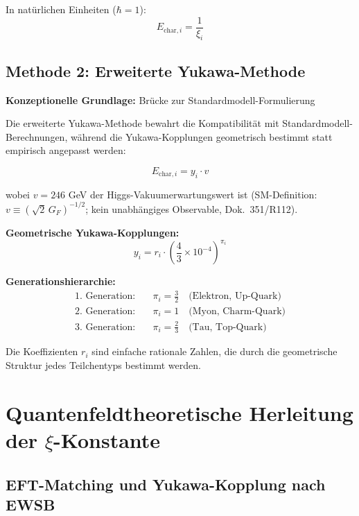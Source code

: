 In natürlichen Einheiten ($\hbar = 1$):
\begin{equation}
	\boxed{E_{\text{char},i} = \frac{1}{\xi_i}}
	\label{eq:characteristic_energy_direct}
\end{equation}

\subsection{Methode 2: Erweiterte Yukawa-Methode}
\label{subsec:extended_yukawa_method}

\textbf{Konzeptionelle Grundlage:} Brücke zur Standardmodell-Formulierung

Die erweiterte Yukawa-Methode bewahrt die Kompatibilität mit Standardmodell-Berechnungen, während die Yukawa-Kopplungen geometrisch bestimmt statt empirisch angepasst werden:

\begin{equation}
	E_{\text{char},i} = y_i \cdot v
	\label{eq:yukawa_mass_formula}
\end{equation}

wobei $v = 246$ GeV der Higgs-Vakuumerwartungswert ist (SM-Definition: $v\equiv(\sqrt{2}\,G_F)^{-1/2}$; kein unabhängiges Observable, Dok.~351/R112).

\textbf{Geometrische Yukawa-Kopplungen:}
\begin{equation}
	\boxed{y_i = r_i \cdot \left(\frac{4}{3} \times 10^{-4}\right)^{\pi_i}}
	\label{eq:geometric_yukawa}
\end{equation}

\textbf{Generationshierarchie:}
\begin{align}
	\text{1. Generation:} \quad &\pi_i = \frac{3}{2} \quad \text{(Elektron, Up-Quark)} \\
	\text{2. Generation:} \quad &\pi_i = 1 \quad \text{(Myon, Charm-Quark)} \\
	\text{3. Generation:} \quad &\pi_i = \frac{2}{3} \quad \text{(Tau, Top-Quark)}
\end{align}

Die Koeffizienten $r_i$ sind einfache rationale Zahlen, die durch die geometrische Struktur jedes Teilchentyps bestimmt werden.

\section{Quantenfeldtheoretische Herleitung der $\xi$-Konstante}
\label{sec:qft_derivation}

\subsection{EFT-Matching und Yukawa-Kopplung nach EWSB}
\label{subsec:eft_matching}

